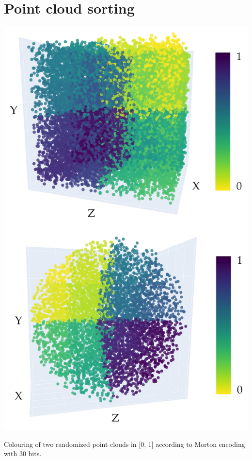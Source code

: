 \section{Point cloud sorting}

\begin{marginfigure}[1cm]
    \centering
    \includegraphics[width=\linewidth]{figs/multi_thermal_projection/point_cloud_morton.png}
    \caption{Colouring of two randomized point clouds in [0, 1] according to Morton encoding with 30 bits. }
	\label{fig:morton_point_cloud}
\end{marginfigure}
